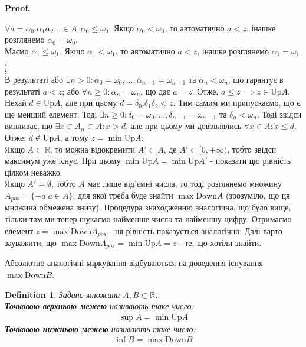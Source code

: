 \documentclass[a4paper, 14pt]{article}
\makeatletter
\def\qed{$\blacksquare$}
\theoremstyle{theoremdd}
\theoremstyle{theoremdd}
\newtheorem{definition}[theorem]{Definition}
\theoremstyle{theoremdd}
\theoremstyle{theoremdd}
\theoremstyle{theoremdd}
\theoremstyle{theoremdd}
\theoremstyle{theoremdd}
\theoremstyle{theoremdd}
\renewenvironment{proof}[1][Proof.\\]{\par
\pushQED{\hfill \qed}%
\normalfont \topsep6\p@\@plus6\p@\relax
\trivlist
\item\relax
{\bfseries
#1\@addpunct{.}}\hspace\labelsep\ignorespaces
}{%
\popQED\endtrivlist\@endpefalse
}
\makeatother
\begin{document}
\begin{proof}
	$\forall a = \alpha_0.\alpha_1\alpha_2\dots \in A: \alpha_0 \leq \omega_0$. Якщо $\alpha_0 < \omega_0$, то автоматично $a < z$, інашке розглянемо $\alpha_0 = \omega_0$.\\
	Маємо $\alpha_1 \leq \omega_1$. Якщо $\alpha_1 < \omega_1$, то автоматично $a < z$, інашке розглянемо $\alpha_1 = \omega_1$.\\
	$\vdots$\\
	В результаті або $\exists n > 0: \alpha_0 = \omega_0 , \dots, \alpha_{n-1} = \omega_{n-1}$ та $\alpha_n < \omega_n$, що гарантує в результаті $a < z$; або $\forall n \geq 0: \alpha_n = \omega_n$, що дає $a = z$. Отже, $a \leq z \implies z \in \text{Up}A$.\\
	Нехай $d \in \text{Up}A$, але при цьому $d = \delta_0.\delta_1\delta_2 < z$. Тим самим ми припускаємо, що є ще менший елемент. Тоді $\exists n \geq 0: \delta_0 = \omega_0, \dots, \delta_{n-1} = \omega_{n-1}$ та $\delta_n < \omega_n$. Тоді звідси випливає, що $\exists x \in A_n \subset A: x > d$, але при цьому ми дововлялись $\forall x \in A: x \leq d$. Отже, $d \not\in \text{Up}A$, а тому $z = \displaystyle\min \text{Up}A$.
	\bigskip \\
	Якщо $A \subset \mathbb{R}$, то можна відокремити $A' \subset A$, де $A' \subset [0,+\infty)$, тобто звідси максимум уже існує. При цьому $\min \text{Up} A = \min \text{Up} A'$ - показати цю рівність цілком неважко.
	\bigskip \\
	Якщо $A' = \emptyset$, тобто $A$ має лише від'ємні числа, то тоді розглянемо множину $A_{pos} = \{-a | a \in A\}$, для якої треба буде знайти $\max \text{Down} A$ (зрозуміло, що ця множина обмежена знизу). Процедура знаходженню аналогічна, що було вище, тільки там ми тепер шукаємо найменше число та найменшу цифру. Отримаємо елемент $z = \displaystyle\max \text{Down} A_{pos}$ - ця рівність показується аналогічно. Далі варто зауважити, що $\max \text{Down} A_{pos} = \min \text{Up} A = z$ - те, що хотіли знайти.
	\end{proof}
	
	Абсолютно аналогічні міркування відбуваються на доведення існування $\max \text{Down} B$.
	
	\begin{definition} Задано множини $A,B \subset \mathbb{R}$.\\
	\textbf{Точковою верхньою межею} називають таке число:
	\begin{align*}
	\sup A = \min\text{Up}A
	\end{align*}
	\textbf{Точковою нижньою межею} називають таке число:
	\begin{align*}
	\inf B = \max\text{Down}B
	\end{align*}
	\end{definition}
	
\end{document}
